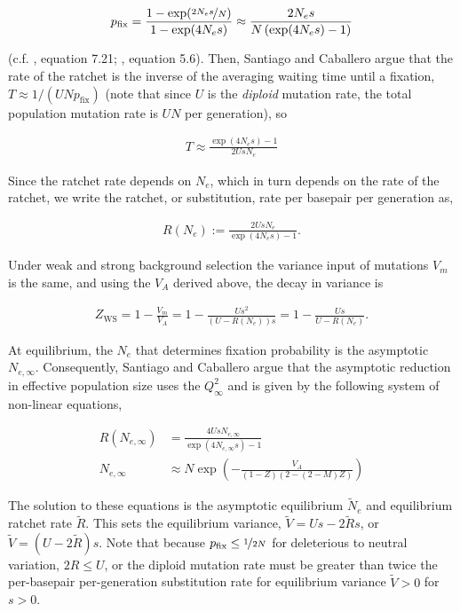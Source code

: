 \documentclass[11pt]{article}
\begin{document}
\begin{align}
  p_\text{fix} = \frac{1-\exp(\nicefrac{2 N_e s}{N})}{1-\exp(4 N_e s)} \approx
  \frac{2 N_e s}{N \left(\exp(4 N_e s)-1\right)}
\end{align}

(c.f. \cite{Durrett2008-ql}, equation 7.21; \cite{Kimura1957-rk}, equation
5.6). Then, Santiago and Caballero argue that the rate of the ratchet is the
inverse of the averaging waiting time until a fixation, $T \approx 1/(UN
p_\text{fix})$ (note that since $U$ is the \emph{diploid} mutation rate, the
total population mutation rate is $UN$ per generation), so

\begin{align}
  T \approx \frac{\exp(4 N_e s)-1}{2 U s N_e}
\end{align}

Since the ratchet rate depends on $N_e$, which in turn depends on the rate of
the ratchet, we write the ratchet, or substitution, rate per basepair per
generation as,

\begin{align}
  R(N_e) := \frac{2 U s N_e}{\exp(4 N_e s)-1}.
\end{align}

Under weak and strong background selection the variance input of mutations
$V_m$ is the same, and using the $V_A$ derived above, the decay in variance is

\begin{align}
  Z_\text{WS} = 1 - \frac{V_m}{V_A} = 1 - \frac{Us^2}{(U-R(N_e))s} = 1 - \frac{Us}{U-R(N_e)}.
\end{align}

At equilibrium, the $N_e$ that determines fixation probability is the
asymptotic $N_{e,\infty}$. Consequently, Santiago and Caballero argue that the
asymptotic reduction in effective population size uses the $Q_\infty^2$ and is
given by the following system of non-linear equations,

\begin{align}
  R(N_{e,\infty}) &= \frac{4 U s N_{e,\infty}}{\exp(4 N_{e,\infty} s)-1}\\
  N_{e,\infty} &\approx N \exp\left(-\frac{V_A}{(1-Z) (2-(2-M) Z)} \right)
\end{align}

The solution to these equations is the asymptotic equilibrium $\widetilde{N}_e$
and equilibrium ratchet rate $\widetilde{R}$. This sets the equilibrium
variance, $\widetilde{V} = Us - 2\widetilde{R}s$, or $\widetilde{V} = (U -
2\widetilde{R})s$. Note that because $p_\text{fix} \le \nicefrac{1}{2N}$ for
deleterious to neutral variation, $2R \le U$, or the diploid mutation rate must
be greater than twice the per-basepair per-generation substitution rate for
equilibrium variance $\widetilde{V} > 0$ for $s>0$. 
\end{document}
